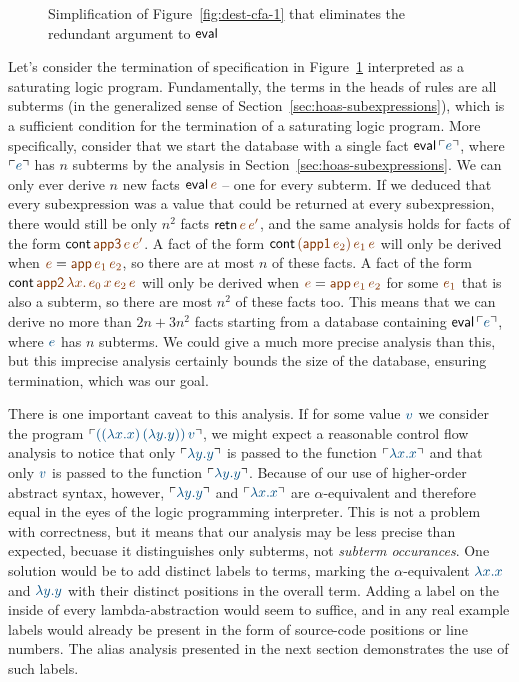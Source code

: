 \begin{figure}[t]
\caption{Simplification of Figure~\ref{fig:dest-cfa-1} that
  eliminates the redundant argument to ${\sf eval}$}
\label{fig:dest-cfa-2}
\end{figure}

Let's consider the termination of specification in
Figure~\ref{fig:dest-cfa-2} interpreted as a saturating logic program.
Fundamentally, the terms in the heads of rules are all subterms (in
the generalized sense of Section~\ref{sec:hoas-subexpressions}), which
is a sufficient condition for the termination of a saturating logic
program. More specifically, consider that we start the database with a
single fact ${\sf eval}\,\interp{e}$, where $\interp{e}$ has $n$
subterms by the analysis in Section~\ref{sec:hoas-subexpressions}.  We
can only ever derive $n$ new facts ${\sf eval}\,\lf{e}$ -- one for
every subterm. If we deduced that every subexpression was a value that
could be returned at every subexpression, there would still be only
$n^2$ facts ${\sf retn}\,\lf{e}\,\lf{e'}$, and the same analysis holds
for facts of the form ${\sf cont}\,\lf{\sf app3}\,\lf{e}\,\lf{e'}$.  A
fact of the form ${\sf cont}\,\lf{({\sf
    app1}\,e_2)}\,\lf{e_1}\,\lf{e}$ will only be derived when $\lf{e}
= \lf{{\sf app}\,e_1\,e_2}$, so there are at most $n$ of these
facts. A fact of the form ${\sf cont}\,\lf{{\sf app2}\,\lambda
  x.\,e_0\,x}\,\lf{e_2}\,\lf{e}$ will only be derived when $\lf{e} =
\lf{{\sf app}\,\lf{e_1}\,\lf{e_2}}$ for some $\lf{e_1}$ that is also a
subterm, so there are most $n^2$ of these facts too. This means that
we can derive no more than $2n + 3n^2$ facts starting from a database
containing ${\sf eval}\,\interp{e}$, where $\obj{e}$ has $n$ subterms.
We could give a much more precise analysis than this, but this
imprecise analysis certainly bounds the size of the database, ensuring
termination, which was our goal.

There is one important caveat to this analysis. If for some value
$\obj{v}$ we consider the program $\interp{((\lambda x.x)\,(\lambda
  y.y))\,v}$, we might expect a reasonable control flow analysis to
notice that only $\interp{\lambda y.y}$ is passed to the function
$\interp{\lambda x.x}$ and that only $\obj{v}$ is passed to the
function $\interp{\lambda y.y}$. Because of our use of higher-order
abstract syntax, however, $\interp{\lambda y.y}$ and $\interp{\lambda
  x.x}$ are $\alpha$-equivalent and therefore equal in the eyes of the
logic programming interpreter. This is not a problem with correctness,
but it means that our analysis may be less precise than expected,
becuase it distinguishes only subterms, not {\it subterm
  occurances}. One solution would be to add distinct labels to terms,
marking the $\alpha$-equivalent $\obj{\lambda x.x}$ and $\obj{\lambda
  y.y}$ with their distinct positions in the overall term. Adding a
label on the inside of every lambda-abstraction would seem to suffice,
and in any real example labels would already be present in the form of
source-code positions or line numbers. The alias analysis presented in
the next section demonstrates the use of such labels.

